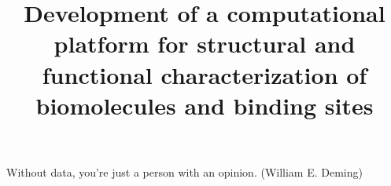 \documentclass[Ingles]{phdthesis}
\begin{document}


\title{Development of a computational platform for structural and functional characterization of biomolecules and binding sites}



\doutorado





\paginasiniciais


\begin{epigrafe}
{
  Without data, you're just a person with an opinion.
}
\hfill (William E. Deming)
\end{epigrafe}
\end{document}
